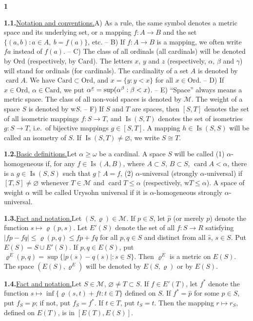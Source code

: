 \documentclass[12pt,a4paper]{article}
\newcommand{\M}{\mathcal{M}}
\newcommand{\card}{\operatorname{card}}
\newcommand{\Ord}{\mathrm{Ord}}
\newcommand{\Card}{\mathrm{Card}}
\newcommand{\Is}{\operatorname{Is}}
\newcommand{\wt}{\mathrm{w}}
\newcommand{\suprexp}[1]{\underaccent{\smile}{#1}}
\newcommand{\res}{\mathbin{\upharpoonright}}
\newcommand{\itemhead}[2]{\par\noindent\textbf{#1.}\enspace\underline{#2.}\enspace}
\newcommand{\sectionnumber}[1]{\par\medskip\begin{center}\textbf{#1}\end{center}}
\begin{document}
\newpage %
\sectionnumber{1}
\itemhead{1.1}{Notation and conventions}A) As a rule, the same symbol denotes a metric space and its underlying set, or a mapping $f:A\longrightarrow B$ and the set $\{(a,b):a\in A,\ b=f(a)\}$, etc. -- B) If $f:A\longrightarrow B$ is a mapping, we often write $fa$ instead of $f(a)$. -- C) The class of all ordinals (all cardinals) will be denoted by $\Ord$ (respectively, by $\Card$). The letters $x$, $y$ and $z$ (respectively, $\alpha$, $\beta$ and $\gamma$) will stand for ordinals (for cardinals). The cardinality of a set $A$ is denoted by $\card A$. We have $\Card\subset\Ord$, and $x=\{y:y<x\}$ for all $x\in\Ord$. -- D) If $x\in\Ord$, $\alpha\in\Card$, we put $\alpha^{\suprexp{x}}=\sup(\alpha^\beta:\beta<x)$. -- E) ``Space'' always means a metric space. The class of all non-void spaces is denoted by $\M$. The weight of a space $S$ is denoted by $\wt S$. -- F) If $S$ and $T$ are spaces, then $[S,T]$ denotes the set of all isometric mappings $f:S\longrightarrow T$, and $\Is(S,T)$ denotes the set of isometries $g:S\longrightarrow T$, i.e.\ of bijective mappings $g\in[S,T]$. A mapping $h\in\Is(S,S)$ will be called an isometry of $S$. If $\Is(S,T)\ne\varnothing$, we write $S\cong T$.

\itemhead{1.2}{Basic definitions}Let $\alpha\geq\omega$ be a cardinal. A space $S$ will be called (1) $\alpha$-homogeneous if, for any $f\in\Is(A,B)$, where $A\subset S$, $B\subset S$, $\card A<\alpha$, there is a $g\in\Is(S,S)$ such that $g\res A=f$, (2) $\alpha$-universal (strongly $\alpha$-universal) if $[T,S]\ne\varnothing$ whenever $T\in\M$ and $\card T\leq\alpha$ (respectively, $\wt T\leq\alpha$). A space of weight $\alpha$ will be called Urysohn universal if it is $\alpha$-homogeneous strongly $\alpha$-universal.

\itemhead{1.3}{Fact and notation}Let $(S,\varrho)\in\M$. If $p\in S$, let $\hat p$ (or merely $p$) denote the function $s\longmapsto\varrho(p,s)$. Let $E'(S)$ denote the set of all $f:S\longrightarrow R$ satisfying $|fp-fq|\leq\varrho(p,q)\leq fp+fq$ for all $p,q\in S$ and distinct from all $\hat s$, $s\in S$. Put $E(S)=S\cup E'(S)$. If $p,q\in E(S)$, put $\varrho^E(p,q)=\sup\{|p(s)-q(s)|:s\in S\}$. Then $\varrho^E$ is a metric on $E(S)$. The space $(E(S),\varrho^E)$ will be denoted by $E(S,\varrho)$ or by $E(S)$.

\itemhead{1.4}{Fact and notation}Let $S\in\M$, $\varnothing\ne T\subset S$. If $f\in E'(T)$, let $f^*$ denote the function $s\longmapsto\inf\{\varrho(s,t)+ft:t\in T\}$ defined on $S$. If $f^*=\hat p$ for some $p\in S$, put $f_S=p$; if not, put $f_S=f^*$. If $t\in T$, put $t_S=t$. Then the mapping $r\longmapsto r_S$, defined on $E(T)$, is in $[E(T),E(S)]$.
\end{document}

